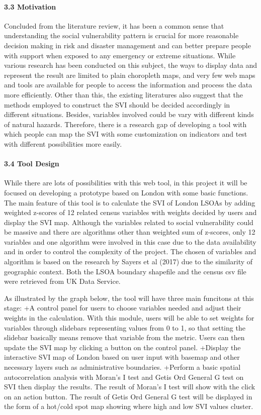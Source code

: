\documentclass[]{article}
\let\oldparagraph\paragraph
\renewcommand{\paragraph}[1]{\oldparagraph{#1}\mbox{}}
\begin{document}
\paragraph{3.3 Motivation}\label{motivation}

Concluded from the literature review, it has been a common sense that
understanding the social vulnerability pattern is crucial for more
reasonable decision making in risk and disaster management and can
better prepare people with support when exposed to any emergency or
extreme situations. While various research has been conducted on this
subject, the ways to display data and represent the result are limited
to plain choropleth maps, and very few web maps and tools are available
for people to access the information and process the data more
efficiently. Other than this, the existing literatures also suggest that
the methods employed to construct the SVI should be decided accordingly
in different situations. Besides, variables involved could be vary with
different kinds of natural hazards. Therefore, there is a research gap
of developing a tool with which people can map the SVI with some
customization on indicators and test with different possibilities more
easily.

\paragraph{3.4 Tool Design}\label{tool-design}

While there are lots of possibilities with this web tool, in this
project it will be focused on developing a prototype based on London
with some basic functions. The main feature of this tool is to calculate
the SVI of London LSOAs by adding weighted z-scores of 12 related census
variables with weights decided by users and display the SVI map.
Although the variables related to social vulnerability could be massive
and there are algorithms other than weighted sum of z-scores, only 12
variables and one algorithm were involved in this case due to the data
availability and in order to control the complexity of the project. The
chosen of variables and algorithm is based on the research by Sayers et
al (2017) due to the similarity of geographic context. Both the LSOA
boundary shapefile and the census csv file were retrieved from UK Data
Service.

As illustrated by the graph below, the tool will have three main
funcitons at this stage: +A control panel for users to choose variables
needed and adjust their weights in the calculation. With this module,
users will be able to set weights for variables through slidebars
representing values from 0 to 1, so that setting the slidebar basically
means remove that variable from the metric. Users can then update the
SVI map by clicking a button on the control panel. +Display the
interactive SVI map of London based on user input with basemap and other
necessary layers such as administrative boundaries. +Perform a basic
spatial autocorrelation analysis with Moran's I test and Getis Ord
General G test on SVI then display the results. The result of Moran's I
test will show with the click on an action button. The result of Getis
Ord General G test will be displayed in the form of a hot/cold spot map
showing where high and low SVI values cluster.
\end{document}
